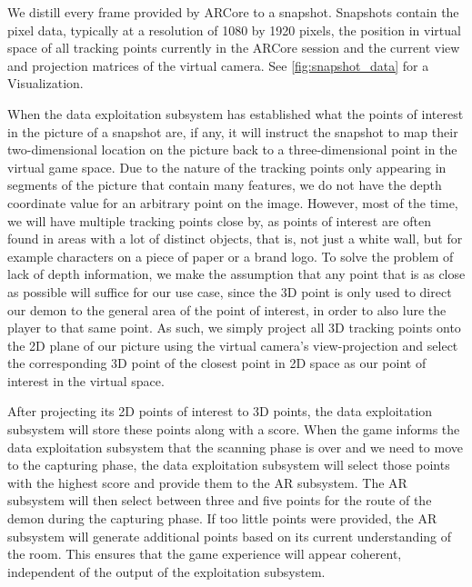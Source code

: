 We distill every frame provided by ARCore to a snapshot.
Snapshots contain the pixel data, typically at a resolution of 1080 by 1920 pixels, the position in virtual space of all tracking points currently in the ARCore session and the current view and projection matrices of the virtual camera. See  \autoref{fig:snapshot_data} for a Visualization.


When the data exploitation subsystem has established what the points of interest in the picture of a snapshot are, if any, it will instruct the snapshot to map their two-dimensional location on the picture back to a three-dimensional point in the virtual game space.
Due to the nature of the tracking points only appearing in segments of the picture that contain many features, we do not have the depth coordinate value for an arbitrary point on the image.
However, most of the time, we will have multiple tracking points close by, as points of interest are often found in areas with a lot of distinct objects, that is, not just a white wall, but for example characters on a piece of paper or a brand logo.
To solve the problem of lack of depth information, we make the assumption that any point that is as close as possible will suffice for our use case, since the 3D point is only used to direct our demon to the general area of the point of interest, in order to also lure the player to that same point.
As such, we simply project all 3D tracking points onto the 2D plane of our picture using the virtual camera's view-projection and select the corresponding 3D point of the closest point in 2D space as our point of interest in the virtual space.

After projecting its 2D points of interest to 3D points, the data exploitation subsystem will store these points along with a score.
When the game informs the data exploitation subsystem that the scanning phase is over and we need to move to the capturing phase, the data exploitation subsystem will select those points with the highest score and provide them to the AR subsystem.
The AR subsystem will then select between three and five points for the route of the demon during the capturing phase.
If too little points were provided, the AR subsystem will generate additional points based on its current understanding of the room.
This ensures that the game experience will appear coherent, independent of the output of the exploitation subsystem.
